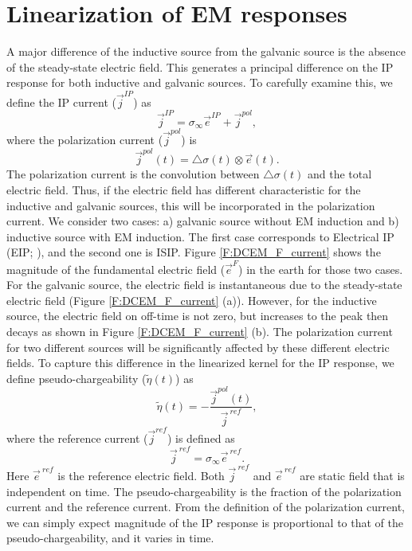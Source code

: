 \documentclass[a4paper, 11pt]{article}
\newcommand{\siginf}{\sigma_\infty}
\newcommand{\dsig}{\triangle\sigma}
\renewcommand {\j}  { {\vec j} }
\newcommand {\e}  { {\vec e} }
\newcommand{\peta}{\tilde{\eta}}
\newcommand{\eref}{\e^{\ ref}}
\begin{document}
\section{Linearization of EM responses}
A major difference of the inductive source from the galvanic source is the absence of the steady-state electric field. 
This generates a principal difference on the IP response for both inductive and galvanic sources. 
To carefully examine this, we define the IP current ($\j^{IP}$) as
\begin{equation}
  \j^{IP} = \siginf \e^{IP} + \j^{pol},
  \label{eq:IP_current}
\end{equation}
where the polarization current ($\j^{pol}$) is
\begin{equation}
  \j^{pol}(t) = \dsig(t) \otimes \e(t).
  \label{eq:polarization_current}
\end{equation}
The polarization current is the convolution between $\dsig (t)$ and the total electric field. 
Thus, if the electric field has different characteristic for the inductive and galvanic sources, this will be incorporated in the polarization current.
We consider two cases: a) galvanic source without EM induction and b) inductive source with EM induction. The first case corresponds to Electrical IP (EIP; \cite{seigel1959}), and the second one is ISIP.
Figure \ref{F:DCEM_F_current} shows the magnitude of the fundamental electric field ($\e^{F}$) in the earth for those two cases. 
For the galvanic source, the electric field is instantaneous due to the steady-state electric field (Figure \ref{F:DCEM_F_current} (a)). 
However, for the inductive source, the electric field on off-time is not zero, but increases to the peak then decays as shown in Figure \ref{F:DCEM_F_current} (b). 
The polarization current for two different sources will be significantly affected by these different electric fields. 
To capture this difference in the linearized kernel for the IP response, we define pseudo-chargeability ($\peta(t)$) as 
\begin{equation}
  \peta(t) = -\frac{\j^{pol}(t)}{\j^{\ ref}},
  \label{eq:pseudochargeability_0}
\end{equation}
where the reference current ($\j^{ref}$) is defined as 
\begin{equation}
  \j^{\ ref} = \siginf \eref.
  \label{eq:reference_current}
\end{equation}
Here $\eref$ is the reference electric field. 
Both $\j^{\ ref}$ and $\eref$ are static field that is independent on time. 
The pseudo-chargeability is the fraction of the polarization current and the reference current. From the definition of the polarization current, we can simply expect magnitude of the IP response is proportional to that of the pseudo-chargeability, and it varies in time. 
\end{document}
